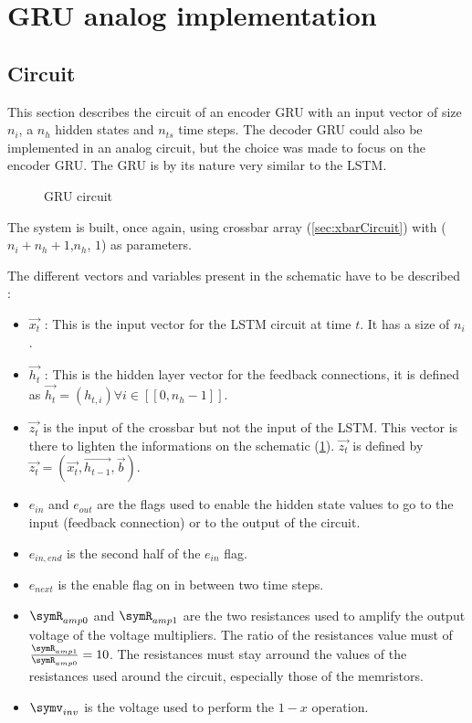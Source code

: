 \section{\acs{GRU} analog implementation}\label{sec:gruCircuit}

\subsection{Circuit}

This section describes the circuit of an encoder \ac{GRU} with an input vector of size $n_i$, a $n_h$ hidden states and $n_{ts}$ time steps. The decoder \ac{GRU} could also be implemented in an analog circuit, but the choice was made to focus on the encoder \ac{GRU}. The \ac{GRU} is by its nature very similar to the \ac{LSTM}.

\begin{figure}[H]
  \centering
  
  \caption{\ac{GRU} circuit}
  \label{circt:lstm}
\end{figure}

The system is built, once again, using crossbar array (\cref{sec:xbarCircuit}) with ($n_i+n_h+1$,$n_h$, $1$) as parameters.

The different vectors and variables present in the schematic have to be described :

\begin{itemize}
  \item $\overrightarrow{x_t}$ : This is the input vector for the \ac{LSTM} circuit at time $t$. It has a size of $n_i$.
  \item $\overrightarrow{h_t}$ : This is the hidden layer vector for the feedback connections, it is defined as $\overrightarrow{h_{t}}=(h_{t,i}) \forall i\in [\![0,n_h-1]\!]$.
  \item $\overrightarrow{z_t}$ is the input of the crossbar but not the input of the \ac{LSTM}. This vector is there to lighten the informations on the schematic (\cref{circt:lstm}). $\overrightarrow{z_t}$ is defined by $\overrightarrow{z_t}=(\overrightarrow{x_t},\overrightarrow{h_{t-1}},\overrightarrow{b})$.
  \item $e_{in}$ and $e_{out}$ are the flags used to enable the hidden state values to go to the input (feedback connection) or to the output of the circuit.
  \item $e_{in,end}$ is the second half of the $e_{in}$ flag.
  \item $e_{next}$ is the enable flag on in between two time steps.
  \item $\symR_{amp0}$ and $\symR_{amp1}$ are the two resistances used to amplify the output voltage of the voltage multipliers. The ratio of the resistances value must of $\frac{\symR_{amp1}}{\symR_{amp0}}=10$. The resistances must stay arround the values of the resistances used around the circuit, especially those of the memristors.
  \item $\symv_{inv}$ is the voltage used to perform the $1-x$ operation.
\end{itemize}

